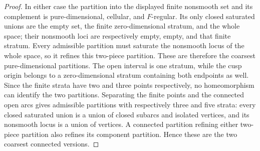 \begin{proof}
In either case the partition into the displayed finite nonsmooth
set and its complement is pure-dimensional, cellular, and
$F$-regular.  Its only closed saturated unions are the empty set,
the finite zero-dimensional stratum, and the whole space; their
nonsmooth loci are respectively empty, empty, and that finite
stratum.  Every admissible partition must saturate the nonsmooth
locus of the whole space, so it refines this two-piece partition.
These are therefore the coarsest pure-dimensional partitions.
The open interval is one stratum, while the cusp origin belongs
to a zero-dimensional stratum containing both endpoints as well.
Since the finite strata have two and three
points respectively, no homeomorphism can identify the two
partitions.  Separating the finite points and the connected open arcs
gives admissible partitions with respectively three and five strata:
every closed saturated union is a union of closed subarcs and isolated
vertices, and its nonsmooth locus is a union of vertices.  A connected
partition refining either two-piece partition also refines its
component partition.  Hence these are the two coarsest connected
versions.
\end{proof}

